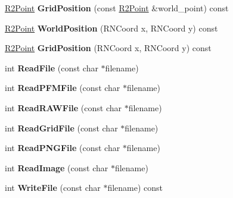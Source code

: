 \begin{DoxyCompactItemize}
\item 
\hyperlink{class_r2_point}{R2\+Point} {\bfseries Grid\+Position} (const \hyperlink{class_r2_point}{R2\+Point} \&world\+\_\+point) const \hypertarget{class_r2_grid_abc374c2517b4902df1828ec5d1bc2606}{}\label{class_r2_grid_abc374c2517b4902df1828ec5d1bc2606}

\item 
\hyperlink{class_r2_point}{R2\+Point} {\bfseries World\+Position} (R\+N\+Coord x, R\+N\+Coord y) const \hypertarget{class_r2_grid_a464dd15d3c537f5b83bf567d5381807c}{}\label{class_r2_grid_a464dd15d3c537f5b83bf567d5381807c}

\item 
\hyperlink{class_r2_point}{R2\+Point} {\bfseries Grid\+Position} (R\+N\+Coord x, R\+N\+Coord y) const \hypertarget{class_r2_grid_ad305f9a4842f78f9efdd09e2265677cd}{}\label{class_r2_grid_ad305f9a4842f78f9efdd09e2265677cd}

\item 
int {\bfseries Read\+File} (const char $\ast$filename)\hypertarget{class_r2_grid_a0004c5367be01d6e557a8a7da5eceb49}{}\label{class_r2_grid_a0004c5367be01d6e557a8a7da5eceb49}

\item 
int {\bfseries Read\+P\+F\+M\+File} (const char $\ast$filename)\hypertarget{class_r2_grid_a9ecc7a1e16aa59abeea1c3caa3c16e72}{}\label{class_r2_grid_a9ecc7a1e16aa59abeea1c3caa3c16e72}

\item 
int {\bfseries Read\+R\+A\+W\+File} (const char $\ast$filename)\hypertarget{class_r2_grid_a48f7bf22b01f9f5a48f5f6542389eecf}{}\label{class_r2_grid_a48f7bf22b01f9f5a48f5f6542389eecf}

\item 
int {\bfseries Read\+Grid\+File} (const char $\ast$filename)\hypertarget{class_r2_grid_a76a84b8211711eca6bbe39a527455281}{}\label{class_r2_grid_a76a84b8211711eca6bbe39a527455281}

\item 
int {\bfseries Read\+P\+N\+G\+File} (const char $\ast$filename)\hypertarget{class_r2_grid_a9325c88135f3082c0b6163e43a39760a}{}\label{class_r2_grid_a9325c88135f3082c0b6163e43a39760a}

\item 
int {\bfseries Read\+Image} (const char $\ast$filename)\hypertarget{class_r2_grid_a8059d2a7838e3e076892fbde26be60b8}{}\label{class_r2_grid_a8059d2a7838e3e076892fbde26be60b8}

\item 
int {\bfseries Write\+File} (const char $\ast$filename) const \hypertarget{class_r2_grid_a48200205e8835a520f02a5fc0d0bdb35}{}\label{class_r2_grid_a48200205e8835a520f02a5fc0d0bdb35}


\end{DoxyCompactItemize}
